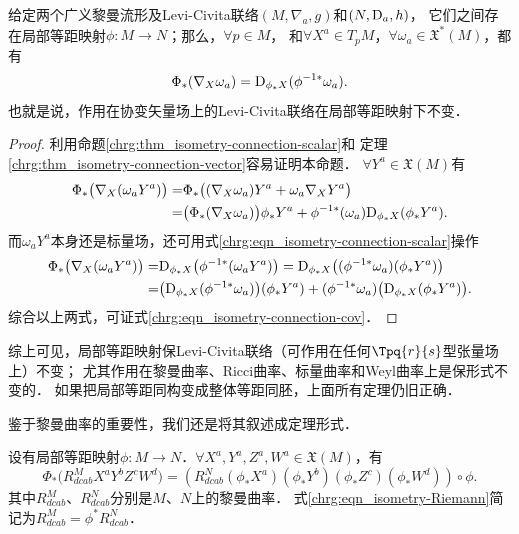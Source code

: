 \begin{proposition}\label{chrg:thm_isometry-connection-cov}
    给定两个广义黎曼流形及Levi-Civita联络$(M,\nabla_a,g)$和$(N,{\rm D}_a,h)$，
    它们之间存在局部等距映射$\phi:M\to N$；那么，$\forall p\in M$，
    和$\forall X^a \in T_{p}M$，$ \forall \omega_a \in \mathfrak{X}^{*}(M)$，都有
    \begin{equation}\label{chrg:eqn_isometry-connection-cov}
    \Phi_{*} (\nabla _X \omega_a) = {\rm D}_ {\phi_* X} ({\phi^{-1*}}\omega_a) .
    \end{equation}
    也就是说，作用在协变矢量场上的Levi-Civita联络在局部等距映射下不变．
\end{proposition}
\begin{proof}
    利用命题\ref{chrg:thm_isometry-connection-scalar}和
    定理\ref{chrg:thm_isometry-connection-vector}容易证明本命题．
    $\forall Y^a \in \mathfrak{X}(M)$有
    \begin{align*}
        \Phi_{*} \bigl(\nabla _X (\omega_a Y^a) \bigr) =&
        \Phi_{*} \bigl((\nabla _X \omega_a )Y^a + \omega_a \nabla _X  Y^a\bigr) \\
        =&\bigl(\Phi_{*} (\nabla _X \omega_a ) \bigr)\phi_{*}Y^a
        + \phi^{-1*}(\omega_a) {\rm D} _{\phi_* X}  (\phi_* Y^a) .
    \end{align*}
    而$\omega_a Y^a$本身还是标量场，还可用式\eqref{chrg:eqn_isometry-connection-scalar}操作
    \begin{align*}
       \Phi_{*} \bigl(\nabla _X (\omega_a Y^a) \bigr) =&  {\rm D}_ {\phi_* X} \bigl({\phi^{-1*}} (\omega_a Y^a)\bigr)
       ={\rm D}_ {\phi_* X} \bigl((\phi^{-1*}\omega_a ) (\phi_{*}Y^a)\bigr) \\
       =&\bigl( {\rm D}_ {\phi_* X} (\phi^{-1*}\omega_a ) \bigr) (\phi_{*}Y^a)
       +(\phi^{-1*}\omega_a ) \bigl({\rm D}_ {\phi_* X}  (\phi_{*}Y^a)\bigr) .
    \end{align*}
    综合以上两式，可证式\eqref{chrg:eqn_isometry-connection-cov}．
\end{proof}
综上可见，局部等距映射保Levi-Civita联络（可作用在任何$\Tpq{r}{s}$型张量场上）不变；
尤其作用在黎曼曲率、Ricci曲率、标量曲率和Weyl曲率上是保形式不变的．
如果把{\kaishu 局部等距同构}变成整体{\kaishu 等距同胚}，上面所有定理仍旧正确．

鉴于黎曼曲率的重要性，我们还是将其叙述成定理形式．
\begin{theorem}\label{chrg:thm_isometry-Riemann}
    设有局部等距映射$\phi:M\to N$．$\forall X^a,Y^a,Z^a,W^a\in \mathfrak{X}(M)$，有
    \begin{equation}\label{chrg:eqn_isometry-Riemann}
        \Phi_{*}\bigl(R_{dcab}^M X^a Y^b Z^c W^d\bigr) = \left(R^N_{dcab}
        (\phi_{*} X^a) (\phi_{*} Y^b) (\phi_{*} Z^c) (\phi_{*} W^d)\right)\circ \phi .
    \end{equation}
    其中$R_{dcab}^M$、$R_{dcab}^N$分别是$M$、$N$上的黎曼曲率．
    式\eqref{chrg:eqn_isometry-Riemann}简记为$R_{dcab}^M=\phi^* R_{dcab}^N$．
\end{theorem}

